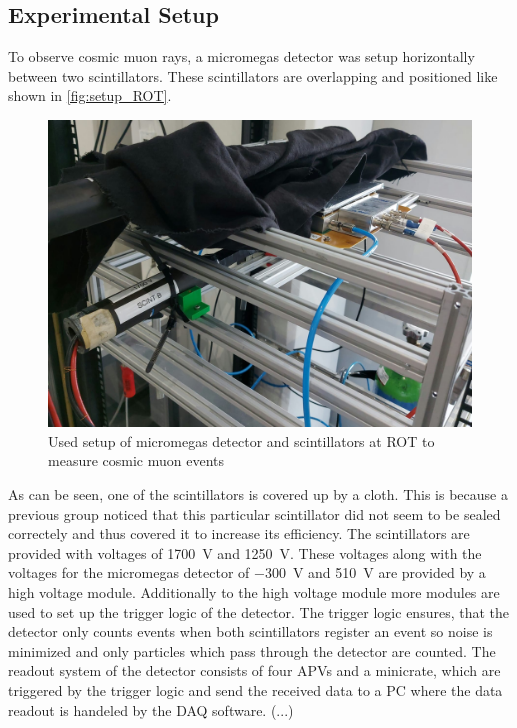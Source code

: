 \documentclass[sn-mathphys-num,iicol]{sn-jnl}
\theoremstyle{thmstyleone}
\theoremstyle{thmstyletwo}
\theoremstyle{thmstylethree}
\begin{document}
\subsection{Experimental Setup}
To observe cosmic muon rays, a micromegas detector was setup horizontally between two scintillators.
These scintillators are overlapping and positioned like shown in \autoref{fig:setup_ROT}.

\begin{figure}
  \includegraphics[width=\linewidth]{figures/setup_ROT.jpeg}
  \caption{Used setup of micromegas detector and scintillators at ROT to measure cosmic muon events}
  \label{fig:setup_ROT}
\end{figure}

As can be seen, one of the scintillators is covered up by a cloth. This is because a previous group noticed that this particular scintillator did not seem to be sealed correctely and thus covered it to increase its efficiency.
The scintillators are provided with voltages of \SI{1700}{\volt} and \SI{1250}{\volt}. These voltages along with the voltages for the micromegas detector of \SI{-300}{\volt} and \SI{510}{\volt} are provided by a high voltage module.
Additionally to the high voltage module more modules are used to set up the trigger logic of the detector.
The trigger logic ensures, that the detector only counts events when both scintillators register an event so noise is minimized and only particles which pass through the detector are counted.
The readout system of the detector consists of four APVs and a minicrate, which are triggered by the trigger logic and send the received data to a PC where the data readout is handeled by the DAQ software.
(...) %
\end{document}
